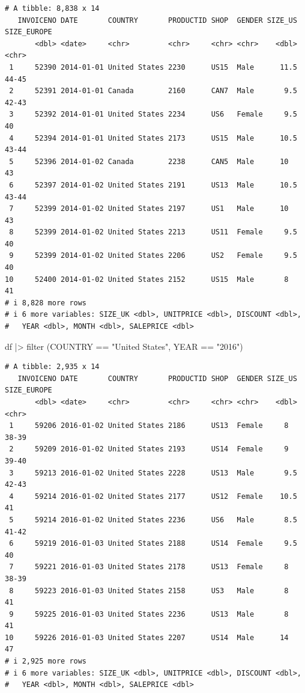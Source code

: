 \documentclass[
  letterpaper,
  DIV=11,
  numbers=noendperiod]{scrreprt}
\newenvironment{Shaded}{\begin{snugshade}}{\end{snugshade}}
\newcommand{\FunctionTok}[1]{\textcolor[rgb]{0.28,0.35,0.67}{#1}}
\newcommand{\NormalTok}[1]{\textcolor[rgb]{0.00,0.23,0.31}{#1}}
\newcommand{\SpecialCharTok}[1]{\textcolor[rgb]{0.37,0.37,0.37}{#1}}
\newcommand{\StringTok}[1]{\textcolor[rgb]{0.13,0.47,0.30}{#1}}
\begin{document}
\begin{verbatim}
# A tibble: 8,838 x 14
   INVOICENO DATE       COUNTRY       PRODUCTID SHOP  GENDER SIZE_US SIZE_EUROPE
       <dbl> <date>     <chr>         <chr>     <chr> <chr>    <dbl> <chr>      
 1     52390 2014-01-01 United States 2230      US15  Male      11.5 44-45      
 2     52391 2014-01-01 Canada        2160      CAN7  Male       9.5 42-43      
 3     52392 2014-01-01 United States 2234      US6   Female     9.5 40         
 4     52394 2014-01-01 United States 2173      US15  Male      10.5 43-44      
 5     52396 2014-01-02 Canada        2238      CAN5  Male      10   43         
 6     52397 2014-01-02 United States 2191      US13  Male      10.5 43-44      
 7     52399 2014-01-02 United States 2197      US1   Male      10   43         
 8     52399 2014-01-02 United States 2213      US11  Female     9.5 40         
 9     52399 2014-01-02 United States 2206      US2   Female     9.5 40         
10     52400 2014-01-02 United States 2152      US15  Male       8   41         
# i 8,828 more rows
# i 6 more variables: SIZE_UK <dbl>, UNITPRICE <dbl>, DISCOUNT <dbl>,
#   YEAR <dbl>, MONTH <dbl>, SALEPRICE <dbl>
\end{verbatim}

\begin{Shaded}
\begin{Highlighting}[]
\NormalTok{df }\SpecialCharTok{|\textgreater{}} \FunctionTok{filter}\NormalTok{ (COUNTRY }\SpecialCharTok{==} \StringTok{"United States"}\NormalTok{, YEAR }\SpecialCharTok{==} \StringTok{"2016"}\NormalTok{)}
\end{Highlighting}
\end{Shaded}

\begin{verbatim}
# A tibble: 2,935 x 14
   INVOICENO DATE       COUNTRY       PRODUCTID SHOP  GENDER SIZE_US SIZE_EUROPE
       <dbl> <date>     <chr>         <chr>     <chr> <chr>    <dbl> <chr>      
 1     59206 2016-01-02 United States 2186      US13  Female     8   38-39      
 2     59209 2016-01-02 United States 2193      US14  Female     9   39-40      
 3     59213 2016-01-02 United States 2228      US13  Male       9.5 42-43      
 4     59214 2016-01-02 United States 2177      US12  Female    10.5 41         
 5     59214 2016-01-02 United States 2236      US6   Male       8.5 41-42      
 6     59219 2016-01-03 United States 2188      US14  Female     9.5 40         
 7     59221 2016-01-03 United States 2178      US13  Female     8   38-39      
 8     59223 2016-01-03 United States 2158      US3   Male       8   41         
 9     59225 2016-01-03 United States 2236      US13  Male       8   41         
10     59226 2016-01-03 United States 2207      US14  Male      14   47         
# i 2,925 more rows
# i 6 more variables: SIZE_UK <dbl>, UNITPRICE <dbl>, DISCOUNT <dbl>,
#   YEAR <dbl>, MONTH <dbl>, SALEPRICE <dbl>
\end{verbatim}
\end{document}

